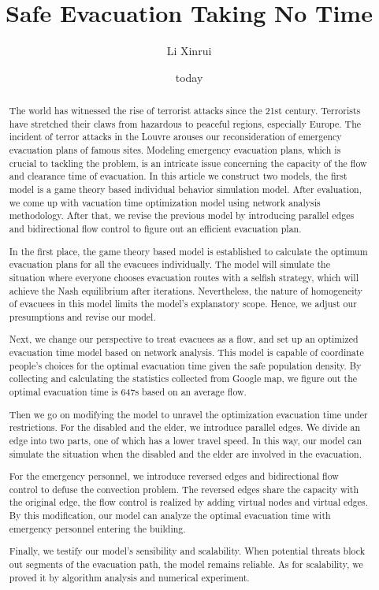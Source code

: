 \documentclass{mcmthesis}
\title{Safe Evacuation Taking No Time}
\author{Li Xinrui}
\date{today}
\begin{document}
	
	\begin{abstract}
		
		
		The world has witnessed the rise of terrorist attacks since the 21st century. Terrorists have stretched their claws from hazardous to peaceful regions, especially Europe. The incident of terror attacks in the Louvre arouses our reconsideration of emergency evacuation plans of famous sites. Modeling emergency evacuation plans, which is crucial to tackling the problem, is an intricate issue concerning the capacity of the flow and clearance time of evacuation. In this article we construct two models, the first model is a game theory based  individual behavior simulation model. After evaluation, we come up with vacuation time optimization model using network analysis methodology. After that, we revise the previous model by introducing parallel edges and bidirectional flow control  to figure out an efficient evacuation plan.
		
		In the first place, the game theory based model is established to calculate the optimum evacuation plans for all the evacuees individually. The model will simulate the situation where everyone chooses evacuation routes with a selfish strategy, which will achieve the Nash equilibrium after iterations. Nevertheless, the nature of homogeneity of evacuees in this model limits the model’s explanatory scope. Hence, we adjust our presumptions and revise our model. 
		
		Next, we change our perspective to treat evacuees as a flow, and set up an optimized evacuation time model based on network analysis. This model is capable of coordinate people's choices for the optimal evacuation time given the safe population density. By collecting and calculating the statistics collected from Google map, we figure out the optimal evacuation time is 647s based on an average flow. 
		
		Then we go on modifying the model to unravel the optimization evacuation time under restrictions. For the disabled and the elder, we introduce parallel edges. We divide an edge into two parts, one of which has a lower travel speed.  In this way, our model can simulate the situation when the disabled and the elder are involved in the evacuation.
		
		For the emergency personnel, we introduce reversed edges and bidirectional flow control to defuse the convection problem. The reversed edges share the capacity with the original edge, the flow control is realized by adding virtual nodes and virtual edges. By this modification, our model can analyze the optimal evacuation time with emergency personnel entering the building.
		
		Finally, we testify our model's sensibility and scalability. When  potential threats block out segments of the evacuation path, the model remains reliable. As for scalability, we proved it by algorithm analysis and numerical experiment.
		
		
	\end{abstract}
	
\end{document}
